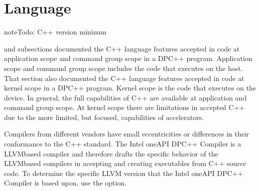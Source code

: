 \documentclass[letterpaper,10pt,english]{sphinxmanual}
\begin{document}
\begin{sphinxVerbatim}[commandchars=\\\{\}]
       
         
    \PYG{p}{[}\PYG{p}{]}\PYG{p}{[}\PYG{p}{]}  
       
 
\end{sphinxVerbatim}


\chapter{Language}
\label{\detokenize{language/index:language}}\label{\detokenize{language/index::doc}}
\begin{sphinxadmonition}{note}{\label{\detokenize{language/index:id1}}Todo:}
C++ version mininum
\end{sphinxadmonition}

{\hyperref[\detokenize{programming-model/index:oneapi-programming-model}]{}} and subsections documented the C++
language features accepted in code at application scope and command
group scope in a DPC++ program.  Application scope and command group
scope includes the code that executes on the host. That section also
documented the C++ language features accepted in code at kernel scope
in a DPC++ program. Kernel scope is the code that executes on the
device. In general, the full capabilities of C++ are available at
application and command group scope. At kernel scope there are
limitations in accepted C++ due to the more limited, but focused,
capabilities of accelerators.

Compilers from different vendors have small eccentricities or
differences in their conformance to the C++ standard. The Intel oneAPI
DPC++ Compiler is a LLVM\sphinxhyphen{}based compiler and therefore drafts the
specific behavior of the LLVM\sphinxhyphen{}based compilers in accepting and creating
executables from C++ source code. To determine the specific LLVM version
that the Intel oneAPI DPC++ Compiler is based upon, use the
 option.
\end{document}
